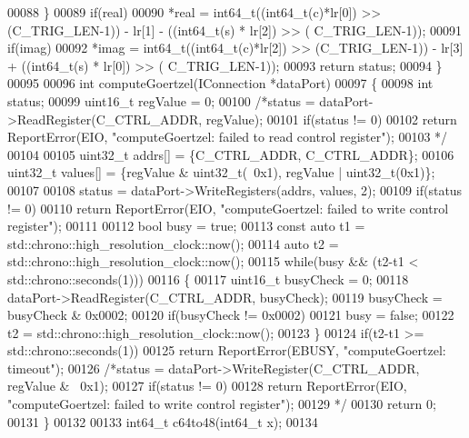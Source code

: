 \begin{DoxyCode}
00088     \}
00089     \textcolor{keywordflow}{if}(real)
00090         *real = int64\_t((int64\_t(c)*lr[0]) >> (C_TRIG_LEN-1)) - lr[1] - ((int64\_t(s) * lr[2]) >> (
      C_TRIG_LEN-1));
00091     \textcolor{keywordflow}{if}(imag)
00092         *imag = int64\_t((int64\_t(c)*lr[2]) >> (C_TRIG_LEN-1)) - lr[3] + ((int64\_t(s) * lr[0]) >> (
      C_TRIG_LEN-1));
00093     \textcolor{keywordflow}{return} status;
00094 \}
00095 
00096 \textcolor{keywordtype}{int} computeGoertzel(IConnection *dataPort)
00097 \{
00098     \textcolor{keywordtype}{int} status;
00099     uint16\_t regValue = 0;
00100     \textcolor{comment}{/*status = dataPort->ReadRegister(C\_CTRL\_ADDR, regValue);}
00101 \textcolor{comment}{    if(status != 0)}
00102 \textcolor{comment}{        return ReportError(EIO, "computeGoertzel: failed to read control register");}
00103 \textcolor{comment}{    */}
00104 
00105     uint32\_t addrs[] = \{C_CTRL_ADDR, C_CTRL_ADDR\};
00106     uint32\_t values[] = \{regValue & uint32\_t(~0x1), regValue | uint32\_t(0x1)\};
00107 
00108     status = dataPort->WriteRegisters(addrs, values, 2);
00109     \textcolor{keywordflow}{if}(status != 0)
00110         \textcolor{keywordflow}{return} ReportError(EIO, \textcolor{stringliteral}{"computeGoertzel: failed to write control register"});
00111 
00112     \textcolor{keywordtype}{bool} busy = \textcolor{keyword}{true};
00113     \textcolor{keyword}{const} \textcolor{keyword}{auto} t1 = std::chrono::high\_resolution\_clock::now();
00114     \textcolor{keyword}{auto} t2 = std::chrono::high\_resolution\_clock::now();
00115     \textcolor{keywordflow}{while}(busy && (t2-t1 < std::chrono::seconds(1)))
00116     \{
00117         uint16\_t busyCheck = 0;
00118         dataPort->ReadRegister(C\_CTRL\_ADDR, busyCheck);
00119         busyCheck = busyCheck & 0x0002;
00120         \textcolor{keywordflow}{if}(busyCheck != 0x0002)
00121             busy = \textcolor{keyword}{false};
00122         t2 = std::chrono::high\_resolution\_clock::now();
00123     \}
00124     \textcolor{keywordflow}{if}(t2-t1 >= std::chrono::seconds(1))
00125         \textcolor{keywordflow}{return} ReportError(EBUSY, \textcolor{stringliteral}{"computeGoertzel: timeout"});
00126     \textcolor{comment}{/*status = dataPort->WriteRegister(C\_CTRL\_ADDR, regValue & ~0x1);}
00127 \textcolor{comment}{    if(status != 0)}
00128 \textcolor{comment}{        return ReportError(EIO, "computeGoertzel: failed to write control register");}
00129 \textcolor{comment}{    */}
00130     \textcolor{keywordflow}{return} 0;
00131 \}
00132 
00133 int64\_t c64to48(int64\_t x);
00134 

\end{DoxyCode}
